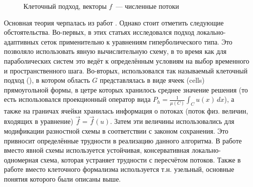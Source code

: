 \begin{wrapfigure}{r}{0.5\textwidth}
    \begin{center}
    \end{center}
    \caption{Клеточный подход, векторы $f$~--- численные потоки}
    \label{fig:cells}
\end{wrapfigure}
Основная теория черпалась из работ \cite{berger1982adaptive, berger1989local, deiterding2011block}.
Однако стоит отметить следующие обстоятельства.
Во-первых, в этих статьях исследовался подход локально-адаптивных сеток применительно к уравнениям гиперболического типа.
Это позволяло использовать явную вычислительную схему, в то время как для параболических систем это ведёт к определённым условиям на выбор временного и пространственного шага.
Во-вторых, использовался так называемый клеточный подход (), в котором область $G$ представлялась в виде ячеек (cells) прямоугольной формы, в цетре которых хранилось среднее значение решения (то есть использовался проекционный оператор вида $P_h = \frac{1}{\mu(C)} \int_{C} u(x)\, dx$), а также на граничах ячейки хранилась информация о потоках (поток физ. величин, входящих в уравнение) $\vec f = \vec f(u)$.
Затем эти величины использовались для модификации разностной схемы в соответствии с законом сохранения.
Это привносит определённые трудности в реализацию данного алгоритма.
В работе вместо явной схемы используется устойчивая, консервативная локально-одномерная схема, которая устраняет трудности с пересчётом потоков.
Также в работе вместо клеточного формализма используется т.н. узельный, основные понятия которого были описаны выше.